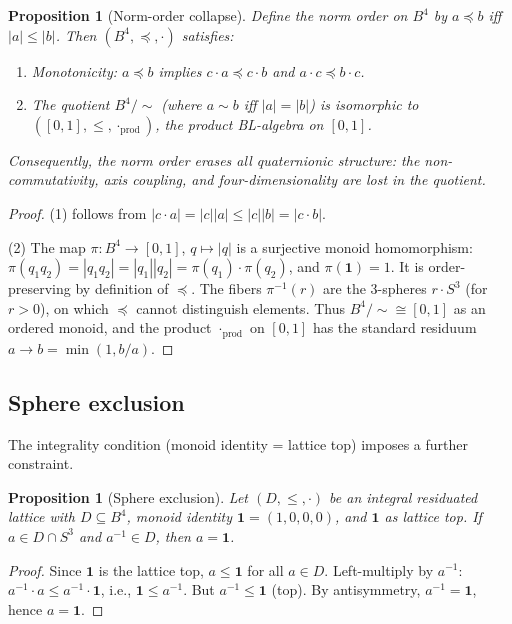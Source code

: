 \documentclass[11pt,a4paper]{article}
\newtheorem{proposition}[theorem]{Proposition}
\begin{document}
\begin{proposition}[Norm-order collapse]
\label{prop:norm-collapse}
Define the \emph{norm order} on $B^4$ by $a \preceq b$ iff
$|a| \leq |b|$. Then $(B^4, \preceq, \cdot)$ satisfies:
\begin{enumerate}[nosep]
\item Monotonicity: $a \preceq b$ implies $c \cdot a \preceq c \cdot b$
  and $a \cdot c \preceq b \cdot c$.
\item The quotient $B^4 / {\sim}$ (where $a \sim b$ iff $|a| = |b|$)
  is isomorphic to $([0,1], \leq, \cdot_{\mathrm{prod}})$, the
  product BL-algebra on $[0,1]$.
\end{enumerate}
Consequently, the norm order erases all quaternionic structure: the
non-commutativity, axis coupling, and four-dimensionality are lost in
the quotient.
\end{proposition}

\begin{proof}
(1) follows from $|c \cdot a| = |c||a| \leq |c||b| = |c \cdot b|$.

(2) The map $\pi \colon B^4 \to [0,1]$, $q \mapsto |q|$ is a surjective
monoid homomorphism: $\pi(q_1 q_2) = |q_1 q_2| = |q_1||q_2|
= \pi(q_1) \cdot \pi(q_2)$, and $\pi(\mathbf{1}) = 1$. It is
order-preserving by definition of $\preceq$. The fibers $\pi^{-1}(r)$
are the 3-spheres $r \cdot S^3$ (for $r > 0$), on which $\preceq$
cannot distinguish elements. Thus $B^4/{\sim} \cong [0,1]$ as an
ordered monoid, and the product $\cdot_{\mathrm{prod}}$ on $[0,1]$
has the standard residuum $a \to b = \min(1, b/a)$.
\end{proof}

\subsection{Sphere exclusion}

The integrality condition (monoid identity = lattice top) imposes a
further constraint.

\begin{proposition}[Sphere exclusion]
\label{prop:sphere-exclusion}
Let $(D, \leq, \cdot)$ be an integral residuated lattice with
$D \subseteq B^4$, monoid identity $\mathbf{1} = (1,0,0,0)$, and
$\mathbf{1}$ as lattice top. If $a \in D \cap S^3$ and
$a^{-1} \in D$, then $a = \mathbf{1}$.
\end{proposition}

\begin{proof}
Since $\mathbf{1}$ is the lattice top, $a \leq \mathbf{1}$ for all
$a \in D$. Left-multiply by $a^{-1}$:
$a^{-1} \cdot a \leq a^{-1} \cdot \mathbf{1}$, i.e.,
$\mathbf{1} \leq a^{-1}$. But $a^{-1} \leq \mathbf{1}$ (top).
By antisymmetry, $a^{-1} = \mathbf{1}$, hence $a = \mathbf{1}$.
\end{proof}
\end{document}
